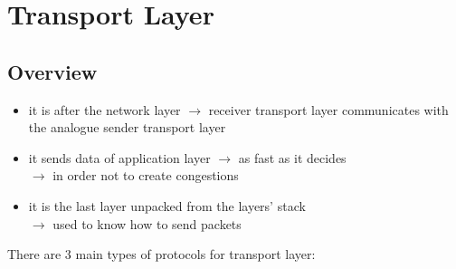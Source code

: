 \section{Transport Layer}
\subsection{Overview}
\begin{itemize}
    \item it is after the network layer $\rightarrow$ receiver transport layer communicates with the analogue sender transport layer
    \item it sends data of application layer $\rightarrow$ as fast as it decides\\$\rightarrow$ in order not to create congestions
    \item it is the last layer unpacked from the layers' stack\\$\rightarrow$ used to know how to send packets
\end{itemize}
There are 3 main types of protocols for transport layer:
